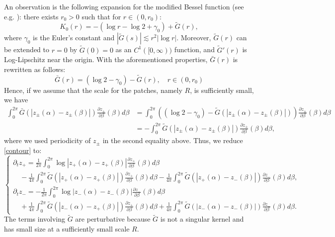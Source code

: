 \documentclass[11pt,reqno]{amsproc}
\newcommand{\pa}{\partial}
\begin{document}
An observation is the following expansion for the modified Bessel function (see e.g. \cite{bessel,bessel1}): there exists $r_0 > 0$ such that for $ r \in (0,r_0)$:
\begin{equation}\label{tildeG}
K_0(r) = -\left(\log r - \log 2 + \gamma_0\right) + \tilde G(r),
\end{equation}
where $\gamma_0$ is the Euler's constant and $|\tilde G(s)| \lesssim r^2 |\log r|$. Moreover, $\tilde G(r)$ can be extended to $r= 0$ by $\tilde G(0) = 0$ as an $C^1([0,\infty))$ function, and $\tilde G'(r)$ is Log-Lipschitz near the origin. With the aforementioned properties, $\bar G(r)$ is rewritten as follows:
$$
\bar G(r) = (\log 2 - \gamma_0) - \tilde G(r),\quad r \in (0,r_0)
$$
Hence, if we assume that the scale for the patches, namely $R$, is sufficiently small, we have
\begin{align*}
    \int_0^{2\pi} \bar G(|z_\pm(\alpha) - z_\pm(\beta)|)\frac{\pa z_\pm}{\pa \beta}(\beta) d\beta &= \int_0^{2\pi} \left((\log 2 - \gamma_0) - \tilde G(|z_\pm(\alpha) - z_\pm(\beta)|)\right)\frac{\pa z_\pm}{\pa \beta}(\beta) d\beta\\
    &= -\int_0^{2\pi} \tilde G(|z_\pm(\alpha) - z_\pm(\beta)|)\frac{\pa z_\pm}{\pa \beta}(\beta) d\beta,
\end{align*}
where we used periodicity of $z_\pm$ in the second equality above. Thus, we reduce \eqref{contour} to:
\begin{equation}
    \label{contour2}
    \begin{cases}
        \pa_t z_+ = \frac{1}{2\pi}\int_0^{2\pi} \log|z_+(\alpha) - z_+(\beta)| \frac{\pa z_+}{\pa \beta}(\beta) d\beta\\
    \quad- \frac{1}{4\pi} \int_0^{2\pi} \tilde G(|z_+(\alpha) - z_+(\beta)|)\frac{\pa z_+}{\pa \beta}(\beta) d\beta - \frac{1}{4\pi} \int_0^{2\pi} \tilde G(|z_+(\alpha) - z_-(\beta)|)\frac{\pa z_-}{\pa \beta}(\beta) d\beta,\\
    \pa_t z_- = -\frac{1}{2\pi}\int_0^{2\pi} \log|z_-(\alpha) - z_-(\beta)| \frac{\pa z_-}{\pa \beta}(\beta) d\beta\\
    \quad+ \frac{1}{4\pi} \int_0^{2\pi} \tilde G(|z_-(\alpha) - z_+(\beta)|)\frac{\pa z_+}{\pa \beta}(\beta) d\beta + \frac{1}{4\pi} \int_0^{2\pi} \tilde G(|z_-(\alpha) - z_-(\beta)|)\frac{\pa z_-}{\pa \beta}(\beta) d\beta.
    \end{cases}
\end{equation}
The terms involving $\tilde G$ are perturbative because $\tilde G$ is not a singular kernel and has small size at a sufficiently small scale $R$.
\end{document}
